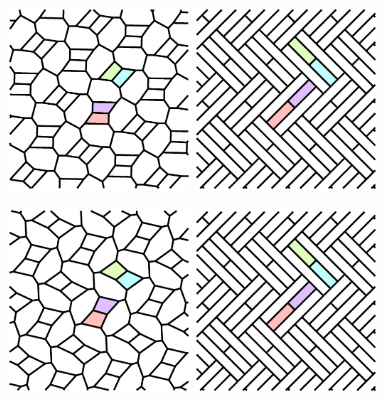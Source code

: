 \documentclass{beamer}
\begin{document}
\begin{frame}
  \begin{center}
    \includegraphics[width=1.9in]{c08}
    \includegraphics[width=1.9in]{c12}
  \end{center}
\end{frame}

\begin{frame}
  \begin{center}
    \includegraphics[width=1.9in]{c09}
    \includegraphics[width=1.9in]{c12}
  \end{center}
\end{frame}
\end{document}
